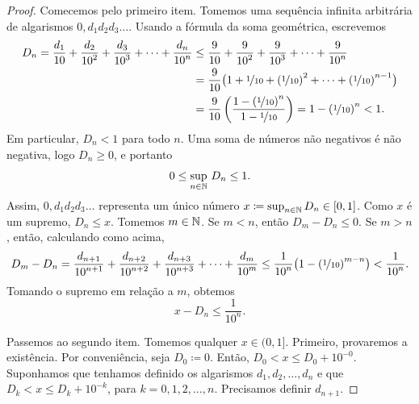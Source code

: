 \begin{proof}
Comecemos pelo primeiro item. Tomemos uma sequência infinita arbitrária de
algarismos $0{,}d_1d_2d_3\ldots$. Usando a fórmula da soma geométrica, escrevemos
\begin{equation*}
\begin{split}
D_n =
\frac{d_1}{10} +
\frac{d_2}{{10}^2} +
\frac{d_3}{{10}^3} +
\cdots +
\frac{d_n}{{10}^n}
& \leq
\frac{9}{10} +
\frac{9}{{10}^2} +
\frac{9}{{10}^3} +
\cdots +
\frac{9}{{10}^n}
\\
& =
\frac{9}{10}
\bigl( 1 + \nicefrac{1}{10} +
{(\nicefrac{1}{10})}^2 + \cdots +
{(\nicefrac{1}{10})}^{n-1} \bigr)
\\
& =
\frac{9}{10}
\left(
\frac{1-{(\nicefrac{1}{10})}^{n}}{1-\nicefrac{1}{10}}
\right)
= 1-{(\nicefrac{1}{10})}^{n}
< 1 .
\end{split}
\end{equation*}
Em particular, $D_n < 1$ para todo $n$. Uma soma de números não negativos é
não negativa, logo $D_n \geq 0$, e portanto
\begin{equation*}
0 \leq \sup_{n\in {\mathbb{N}}} \, D_n \leq 1 .
\end{equation*}
Assim, $0{,}d_1d_2d_3\ldots$ representa um único número
$x \coloneqq \sup_{n\in {\mathbb{N}}} D_n \in [0,1]$.
Como $x$ é um supremo, $D_n \leq x$.
Tomemos $m \in {\mathbb{N}}$. Se $m < n$, então $D_m - D_n \leq 0$. Se $m > n$, então,
calculando como acima,
\begin{equation*}
D_m - D_n
=
\frac{d_{n+1}}{{10}^{n+1}} +
\frac{d_{n+2}}{{10}^{n+2}} +
\frac{d_{n+3}}{{10}^{n+3}} +
\cdots +
\frac{d_{m}}{{10}^m}
\leq
\frac{1}{{10}^{n}}
\bigl(
1-{(\nicefrac{1}{10})}^{m-n}
\bigr)
<
\frac{1}{{10}^{n}} .
\end{equation*}
Tomando o supremo em relação a $m$, obtemos
\begin{equation*}
x - D_n
\leq
\frac{1}{{10}^{n}} .
\end{equation*}

Passemos ao
segundo item. Tomemos qualquer $x \in (0,1]$.
Primeiro, provaremos a existência.
Por conveniência, seja $D_0 \coloneqq 0$.
Então,
$D_0 < x \leq D_0 + {10}^{-0}$.
Suponhamos que tenhamos definido os algarismos $d_1,d_2,\ldots,d_n$
e que
$D_k < x \leq D_k + {10}^{-k}$, para $k=0,1,2,\ldots,n$. Precisamos definir $d_{n+1}$.


\end{proof}

